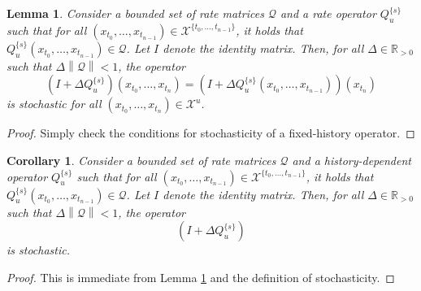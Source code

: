 \documentclass[a4paper,reqno]{amsart}
\newtheorem{corollary}[theorem]{Corollary}
\newtheorem{lemma}[theorem]{Lemma}
\newcommand{\reals}{\mathbb{R}}
\newcommand{\realspos}{\reals_{>0}}
\newcommand{\states}{\mathcal{X}}
\newcommand{\gambles}{\mathcal{L}}
\newcommand{\norm}[1]{\left\lVert #1 \right\rVert}
\newcommand{\coloneqq}{:\!=}
\begin{document}
\begin{lemma}\label{lemma:nonmarkov_fixed_history_rate_stochastic}
Consider a bounded set of rate matrices $\mathcal{Q}$ and a rate operator $Q_u^{\{s\}}$ such that for all $(x_{t_0},\ldots,x_{t_{n-1}})\in\states^{\{t_0,\ldots,t_{n-1}\}}$, it holds that $Q_u^{\{s\}}(x_{t_0},\ldots,x_{t_{n-1}})\in\mathcal{Q}$. Let $I$ denote the identity matrix. Then, for all $\Delta\in\realspos$ such that $\Delta\norm{\mathcal{Q}}<1$, the operator
\begin{equation*}
\left(I + \Delta Q_u^{\{s\}}\right)(x_{t_0},\ldots,x_{t_{n}}) = \left(I + \Delta Q_u^{\{s\}}(x_{t_0},\ldots,x_{t_{n-1}})\right)(x_{t_n})
\end{equation*}
is stochastic for all $(x_{t_0},\ldots,x_{t_{n}})\in\states^{u}$.

\end{lemma}
\begin{proof}
Simply check the conditions for stochasticity of a fixed-history operator.
\end{proof}


\begin{corollary}\label{lemma:nonmarkov_rate_stochastic}
Consider a bounded set of rate matrices $\mathcal{Q}$ and a history-dependent operator $Q_u^{\{s\}}$ such that for all $(x_{t_0},\ldots,x_{t_{n-1}})\in\states^{\{t_0,\ldots,t_{n-1}\}}$, it holds that $Q_u^{\{s\}}(x_{t_0},\ldots,x_{t_{n-1}})\in\mathcal{Q}$. Let $I$ denote the identity matrix. Then, for all $\Delta\in\realspos$ such that $\Delta\norm{\mathcal{Q}}<1$, the operator
\begin{equation*}
\left(I + \Delta Q_u^{\{s\}}\right)
\end{equation*}
is stochastic.
\end{corollary}
\begin{proof}
This is immediate from Lemma \ref{lemma:nonmarkov_fixed_history_rate_stochastic} and the definition of stochasticity.
\end{proof}
\end{document}
